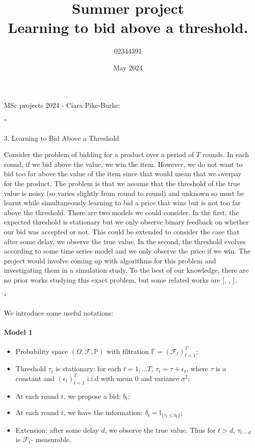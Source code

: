 \documentclass[11pt]{article}
\title{%
  Summer project \\
  \large Learning to bid above a threshold.}
\date{May 2024}
\author{02344391}
\begin{document}
\maketitle

MSc projects 2024 - Ciara Pike-Burke:

"

3. Learning to Bid Above a Threshold

Consider the problem of bidding for a product over a period of $T$ rounds. In each round, if
we bid above the value, we win the item. However, we do not want to bid too far above the
value of the item since that would mean that we overpay for the product. The problem is
that we assume that the threshold of the true value is noisy (so varies slightly from round
to round) and unknown so must be learnt while simultaneously learning to bid a price that
wins but is not too far above the threshold. There are two models we could consider. In the
first, the expected threshold is stationary but we only observe binary feedback on whether
our bid was accepted or not. This could be extended to consider the case that after some
delay, we observe the true value. In the second, the threshold evolves according to some time
series model and we only observe the price if we win. The project would involve coming up
with algorithms for this problem and investigating them in a simulation study. To the best
of our knowledge, there are no prior works studying this exact problem, but some related
works are [\cite{NIPS2016_0bf727e9}, \cite{badanidiyuru2021learning}, \cite{zhang2023learning}].

"

We introduce some useful notations:

\paragraph*{Model 1}

\begin{itemize}
  \item Probability space $(\Omega, \mathcal{F}, \mathbb{P})$ with filtration $\mathbb{F} = (\mathcal{F}_t)_{t=1}^T$;
  \item Threshold $\tau_t$ is stationary: for each $t = 1, \dots T$, $\tau_t = \tau + \epsilon_t$, where $\tau$ is a constant
and $(\epsilon_t)_{t = 1}^T$ i.i.d with mean $0$ and variance $\sigma^2$;
  \item At each round $t$, we propose a bid: $b_t$;
  \item At each round $t$, we have the information: $\delta_t = \mathbb{I}_{\{\tau_t \leq b_t\}}$;
  \item Extension: after some delay $d$, we observe the true value. Thus for $t > d$, $\tau_{t-d}$ is $\mathcal{F}_t$- measurable.
\end{itemize}
\end{document}

